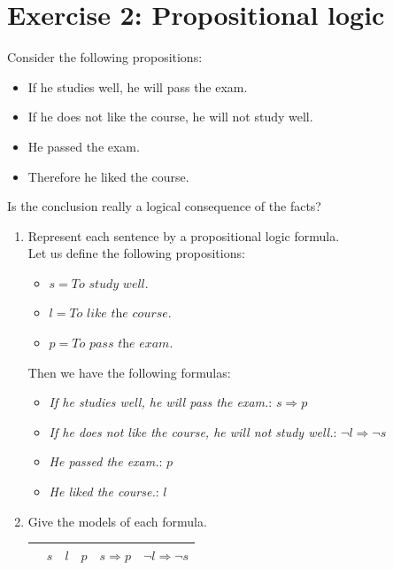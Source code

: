 \documentclass[9pt,a4paper]{extarticle}
\newenvironment{solution}
    {%
    \color{red}
    }
    { 
    \color{black}
    }
\begin{document}
    \section*{Exercise 2: Propositional logic}
    Consider the following propositions:
    \begin{itemize}
        \item If he studies well, he will pass the exam.
        \item If he does not like the course, he will not study well.
        \item He passed the exam.
        \item Therefore he liked the course.
    \end{itemize}
        
    Is the conclusion really a logical consequence of the facts? 
 \begin{enumerate}
     \item Represent each sentence by a propositional logic formula.
     \begin{solution}\\
     Let us define the following propositions:
     \begin{itemize}
         \item $s=\textit{To study well.}$
         \item $l=\textit{To like the course.}$
         \item $p=\textit{To pass the exam.}$
     \end{itemize}
     Then we have the following formulas:
     \begin{itemize}
         \item \textit{If he studies well, he will pass the exam.}: $s \Rightarrow p$
         \item \textit{If he does not like the course, he will not study well.}: $\lnot l \Rightarrow \lnot s$
         \item \textit{He passed the exam.}: $p$
         \item \textit{He
    liked the course.}: $ l$
     \end{itemize}
     \end{solution}
     \item Give the models of each formula.
     \begin{solution}
     \begin{table}[H]
         \centering
         \begin{tabular}{|l|ccc|cc|}
          \hline
             & $s$ & $l$ & $p$ & $s \Rightarrow p$ & $\lnot l \Rightarrow \lnot s$ \\  \hline

\end{tabular}
\end{table}
\end{solution}
\end{enumerate}
\end{document}
